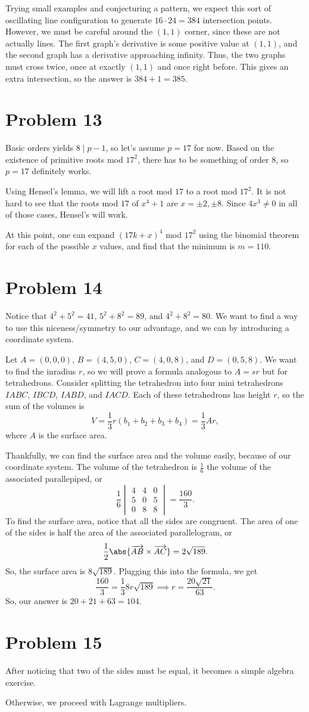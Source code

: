 \documentclass{scrartcl}
\begin{document}
Trying small examples and conjecturing a pattern,
we expect this sort of oscillating line configuration to generate $16 \cdot 24 = 384$
intersection points.
However, we must be careful around the $(1,1)$ corner, since these are not actually lines.
The first graph's derivative is some positive value at $(1,1)$,
and the second graph has a derivative approaching infinity.
Thus, the two graphs must cross twice, once at exactly $(1,1)$ and once right before.
This gives an extra intersection,
so the answer is $384 + 1 = \boxed{385}$.

\section*{Problem 13}
Basic orders yields $8 \mid p-1$, so let's assume $p=17$ for now.
Based on the existence of primitive roots mod $17^2$,
there has to be something of order $8$,
so $p=17$ definitely works.

Using Hensel's lemma, we will lift a root mod $17$ to a root mod $17^2$.
It is not hard to see that the roots mod $17$ of $x^4 + 1$
are $x=\pm2, \pm8$.
Since $4x^3 \ne 0$ in all of those cases, Hensel's will work.

At this point, one can expand $(17k+x)^4$ mod $17^2$ using the binomial
theorem for each of the possible $x$ values, and find
that the minimum is $m = \boxed{110}$.

\section*{Problem 14}
Notice that $4^2 + 5^2 = 41$, $5^2 + 8^2 = 89$, and $4^2 + 8^2 = 80$.
We want to find a way to use this niceness/symmetry to our advantage,
and we can by introducing a coordinate system.

Let $A = (0,0,0)$, $B = (4,5,0)$, $C = (4,0,8)$, and $D = (0,5,8)$.
We want to find the inradius $r$,
so we will prove a formula analogous to $A = sr$ but for tetrahedrons.
Consider splitting the tetrahedron into four mini tetrahedrons
$IABC$, $IBCD$, $IABD$, and $IACD$.
Each of these tetrahedrons has height $r$,
so the sum of the volumes is
\[ V = \frac13 r(b_1 + b_2 + b_3 + b_4) = \frac13 Ar, \]
where $A$ is the surface area.

Thankfully, we can find the surface area and the volume easily,
because of our coordinate system.
The volume of the tetrahedron is $\frac16$ the volume of the
associated parallepiped, or
\[ \frac16 \begin{vmatrix}
    4 & 4 & 0 \\
    5 & 0 & 5 \\
    0 & 8 & 8
\end{vmatrix} = \frac{160}{3}. \]
To find the surface area,
notice that all the sides are congruent.
The area of one of the sides is half the area
of the associated parallelogram, or
\[ \frac12 \abs{\overrightarrow{AB} \times \overrightarrow{AC}} = 2\sqrt{189}. \]
So, the surface area is $8 \sqrt{189}$. Plugging this into the formula, we get
\[ \frac{160}{3} = \frac13 8r\sqrt{189} \implies r = \frac{20\sqrt{21}}{63}. \]
So, our answer is $20 + 21 + 63 = \boxed{104}$.

\section*{Problem 15}
After noticing that two of the sides must be equal,
it becomes a simple algebra exercise.

Otherwise, we proceed with Lagrange multipliers.
\end{document}
